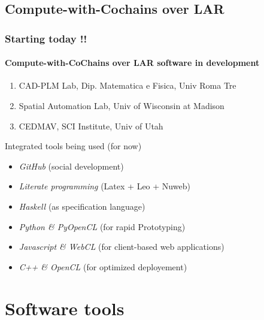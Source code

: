 \documentclass{beamer}
\begin{document}
\subsection{Compute-with-Cochains over LAR}
\begin{frame}
\frametitle{Starting today !!} 
\framesubtitle{\bf Compute-with-CoChains over LAR software in development}


\begin{enumerate}
\item \alert{CAD-PLM Lab}, Dip. Matematica e Fisica, Univ Roma Tre 
\item \alert{Spatial Automation Lab}, Univ of Wisconsin at Madison
\item \alert{CEDMAV}, SCI Institute, Univ of Utah
\end{enumerate}

\vfill\pause
\alert{Integrated tools being used} (for now)

\begin{itemize}
\item \emph{GitHub} (social development)
\item \emph{Literate programming} (Latex + Leo + Nuweb)
\item \emph{Haskell} (as specification language)
\item \emph{Python \& PyOpenCL} (for rapid Prototyping)
\item \emph{Javascript \& WebCL} (for client-based web applications)
\item \emph{C++ \& OpenCL} (for optimized deployement)
\end{itemize}


\end{frame}
\section{Software tools}
\end{document}

